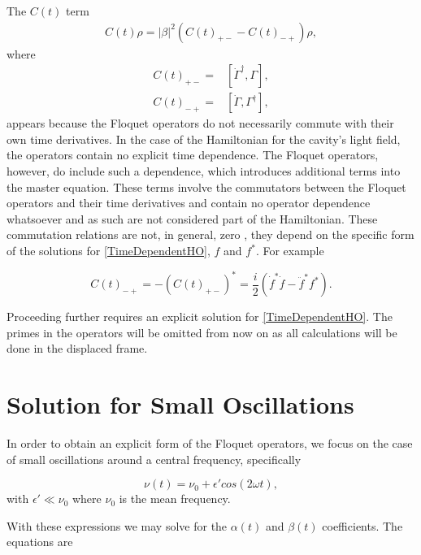 \documentclass[reprint, amsmath,amssymb, aps,pra]{revtex4-1}
\begin{document}
The $C(t)$ term
 \begin{align}
C(t)\rho = |\beta|^2(C(t)_{+-} - C(t)_{-+})\rho \nonumber,
 \end{align}
 where
\begin{align*}
C(t)_{+-} =& [\dot{\Gamma}^{\dagger}, \Gamma],\\
C(t)_{-+} =& [\dot{\Gamma}, \Gamma^{\dagger}],
\end{align*}
appears because the Floquet operators do not necessarily commute with
their own time derivatives. In the case of the Hamiltonian for the
cavity's light field, the operators contain no explicit time
dependence. The Floquet operators, however,
do include such a dependence, which introduces additional terms into
the master equation. These terms involve the commutators between the
Floquet operators and their time derivatives and contain no operator
dependence whatsoever and as such are not considered part of the
Hamiltonian. These commutation relations are not, in general, zero
\cite{TesisMaestria}, they depend on the specific form of the
solutions for \eqref{TimeDependentHO}, $f$ and $f^*$. For example

\begin{equation}
C(t)_{-+} = -(C(t)_{+-})^* = \frac{i}{2}(\dot{f}^* \dot{f} - \ddot{f}^*f^*).
\end{equation}



Proceeding further requires an explicit solution for
\eqref{TimeDependentHO}. The primes in the operators will be omitted
from now on as all calculations will be done in the displaced frame.


\section{Solution for Small Oscillations}\label{SolSmallOsc}
 
In order to obtain an explicit form of the Floquet operators, we focus
on the case of small oscillations around a central frequency,
specifically

\begin{equation}\label{SmallOscillationsTDHO}
\nu(t) = \nu_0 + \epsilon' cos(2\omega t),
\end{equation}
with $\epsilon' \ll \nu_0$ where $\nu_0$ is the mean frequency.


With these expressions we may solve for the $\alpha(t)$ and $\beta(t)$ coefficients. The equations are
\end{document}
